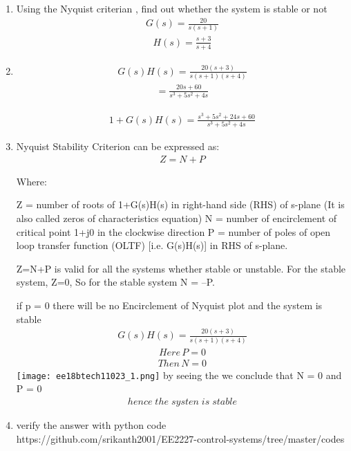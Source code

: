 \begin{enumerate}[label=\thesection.\arabic*.,ref=\thesection.\theenumi]

\item
Using the Nyquist criterian , find out whether the system is stable or not 
\begin{align}
    G(s) = \frac{20}{s(s+1)}
\end{align}
\begin{align}
    H(s)=\frac{s+3}{s+4}
\end{align}

\item
\solution
\begin{align}
    G(s)H(s)=\frac{20(s+3)}{s(s+1)(s+4)}
\end{align}
\begin{align*}
     = \frac{20s+60}{s^{3}+5s^{2}+4s}
\end{align*}

\begin{align}
    1 + G(s)H(s)=\frac{s^{3}+5s^{2}+24s+60}{s^{3}+5s^{2}+4s}
\end{align}
\item
Nyquist Stability Criterion can be expressed as:
\begin{align}
    Z = N + P
\end{align}

Where:
    
\center Z = number of roots of 1+G(s)H(s) in right-hand side (RHS) of s-plane (It is also called zeros of characteristics equation)
\center N = number of encirclement of critical point 1+j0 in the clockwise direction
\center P = number of poles of open loop transfer function (OLTF) [i.e. G(s)H(s)] in RHS of s-plane.

\center Z=N+P is valid for all the systems whether stable or unstable. For the stable system, Z=0,
So for the stable system N = –P. 

\center  if p = 0 \;\;
\center there will be no  Encirclement of Nyquist plot and the system is stable
\begin{align}
    G(s)H(s)=\frac{20(s+3)}{s(s+1)(s+4)}
\end{align}
\begin{align}
    Here \, P = 0
\end{align}
\begin{align}
    Then\,  N = 0
\end{align} 
\texttt{[image: ee18btech11023\_1.png]}
\center   by seeing the we conclude that N = 0 and\;\;\; P = 0 
\begin{align}
    hence \;the\;systen \;is \;stable
\end{align}
\item
verify the answer with python code
https://github.com/srikanth2001/EE2227-control-systems/tree/master/codes
\end{enumerate}